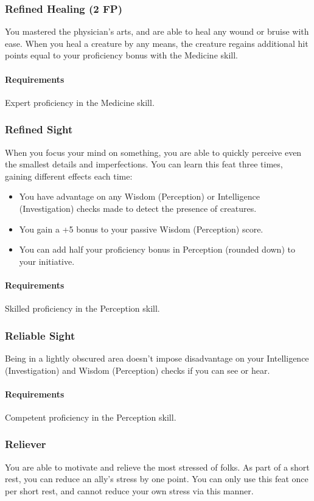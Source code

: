 \subsubsection{Refined Healing (2 FP)} \label{feat::refinedhealing}
    You mastered the physician's arts, and are able to heal any wound or bruise with ease.
    When you heal a creature by any means, the creature regains additional hit points equal to your proficiency bonus with the Medicine skill.
    \paragraph{Requirements} Expert proficiency in the Medicine skill.
\subsubsection{Refined Sight} \label{feat::refinedsight}
    When you focus your mind on something, you are able to quickly perceive even the smallest details and imperfections.
    You can learn this feat three times, gaining different effects each time:
    \begin{itemize}
        \item You have advantage on any Wisdom (Perception) or Intelligence (Investigation) checks made to detect the presence of creatures.
        \item You gain a +5 bonus to your passive Wisdom (Perception) score.
        \item You can add half your proficiency bonus in Perception (rounded down) to your initiative.
    \end{itemize}
    \paragraph{Requirements} Skilled proficiency in the Perception skill.
\subsubsection{Reliable Sight} \label{feat::reliablesight}
    Being in a lightly obscured area doesn't impose disadvantage on your Intelligence (Investigation) and Wisdom (Perception) checks if you can see or hear.
    \paragraph{Requirements} Competent proficiency in the Perception skill.
\subsubsection{Reliever} \label{feat::reliever}
    You are able to motivate and relieve the most stressed of folks.
    As part of a short rest, you can reduce an ally's stress by one point.
    You can only use this feat once per short rest, and cannot reduce your own stress via this manner.
